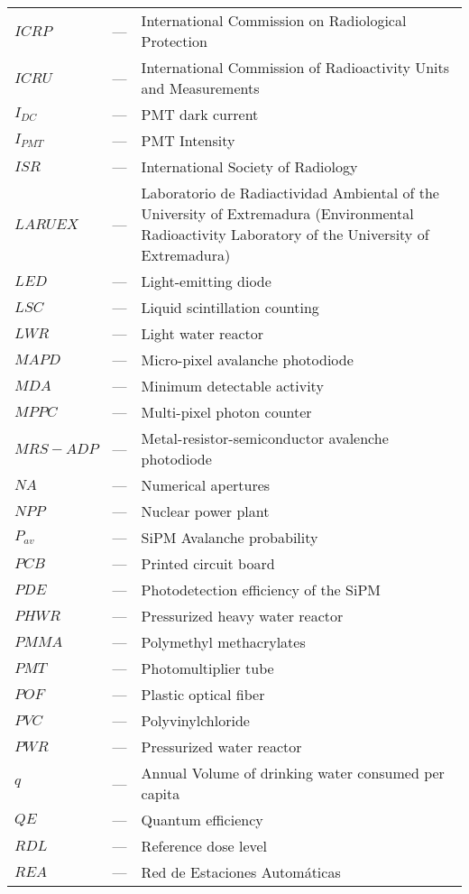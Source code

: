 \begin{longtable}{p{25mm} c p{120mm} }
$ICRP$ & --- & International Commission on Radiological Protection \\
$ICRU$ & --- & International Commission of Radioactivity Units 
\newline
and Measurements\\
$I_{DC}$ & --- & PMT dark current\\
$I_{PMT}$ & --- & PMT Intensity\\
$ISR$ & --- & International Society of Radiology \\
$LARUEX$ & --- & Laboratorio de Radiactividad Ambiental of the University
\newline
of Extremadura (Environmental Radioactivity Laboratory
\newline
of the University of Extremadura)\\
$LED$ & --- & Light-emitting diode \\
$LSC$ & --- & Liquid scintillation counting\\
$LWR$ & --- & Light water reactor\\
$MAPD$ & --- & Micro-pixel avalanche photodiode\\
$MDA$ & --- & Minimum detectable activity\\
$MPPC$ & --- & Multi-pixel photon counter\\
$MRS-ADP$ & --- & Metal-resistor-semiconductor avalenche photodiode\\
$NA$ & --- & Numerical apertures\\
$NPP$ & --- & Nuclear power plant\\
$P_{av}$ & --- & SiPM Avalanche probability\\
$PCB$ & --- & Printed circuit board\\
$PDE$ & --- & Photodetection efficiency of the SiPM\\
$PHWR$ & --- & Pressurized heavy water reactor\\
$PMMA$ & --- & Polymethyl methacrylates\\
$PMT$ & --- & Photomultiplier tube\\
$POF$ & --- & Plastic optical fiber\\
$PVC$ & --- & Polyvinylchloride\\
$PWR$ & --- & Pressurized water reactor\\
$q$ & --- & Annual Volume of drinking water consumed per capita\\
$QE$ & --- & Quantum efficiency\\
$RDL$ & --- & Reference dose level\\
$REA$ & --- & Red de Estaciones Automáticas\\

\end{longtable}
